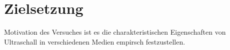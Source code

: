 \section{Zielsetzung}
Motivation des Versuches ist es die charakteristischen Eigenschaften von Ultraschall in verschiedenen Medien empirsch 
festzustellen.
